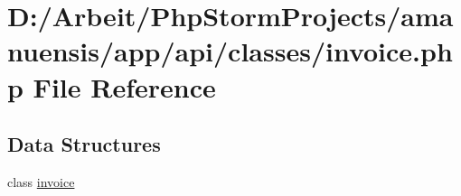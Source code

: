 \hypertarget{a00061}{}\section{D\+:/\+Arbeit/\+Php\+Storm\+Projects/amanuensis/app/api/classes/invoice.php File Reference}
\label{a00061}
\subsection*{Data Structures}
\begin{DoxyCompactItemize}
\item 
class \hyperlink{a00025}{invoice}
\end{DoxyCompactItemize}
